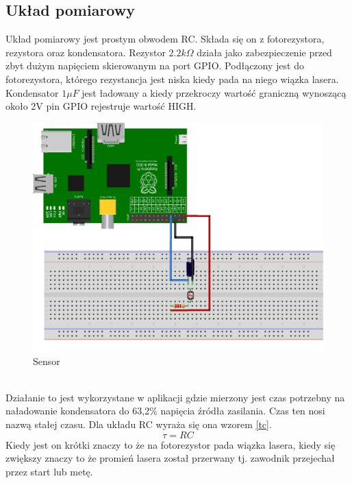 \documentclass[11pt,a4paper, twoside]{article}
\begin{document}
\subsection{Układ pomiarowy}\label{sensor}
Układ pomiarowy jest prostym obwodem RC. Składa się on z fotorezystora, rezystora oraz kondensatora. Rezystor $2.2k \Omega$ działa jako zabezpieczenie przed zbyt dużym napięciem skierowanym na port GPIO. Podłączony jest do fotorezystora, którego rezystancja jest niska kiedy pada na niego wiązka lasera. Kondensator $1\mu F$ jest ładowany a kiedy przekroczy wartość graniczną wynoszącą około 2V pin GPIO rejestruje wartość HIGH.
\begin{figure}[h]
\begin{center}
\includegraphics[scale=0.15]{./img/sensor_bb.png}
\caption{Sensor}
\end{center}
\end{figure}
\\
Działanie to jest wykorzystane w aplikacji gdzie mierzony jest czas potrzebny na naładowanie kondensatora do 63,2\% napięcia źródła zasilania. Czas ten nosi nazwą stałej czasu. Dla układu RC wyraża się ona wzorem \ref{tc}. 
\begin{equation}\label{tc}
	\tau = RC
\end{equation}
Kiedy jest on krótki znaczy to że na fotorezystor pada wiązka lasera, kiedy się zwiększy znaczy to że promień lasera został przerwany tj. zawodnik przejechał przez start lub metę. 
\newpage
\end{document}

